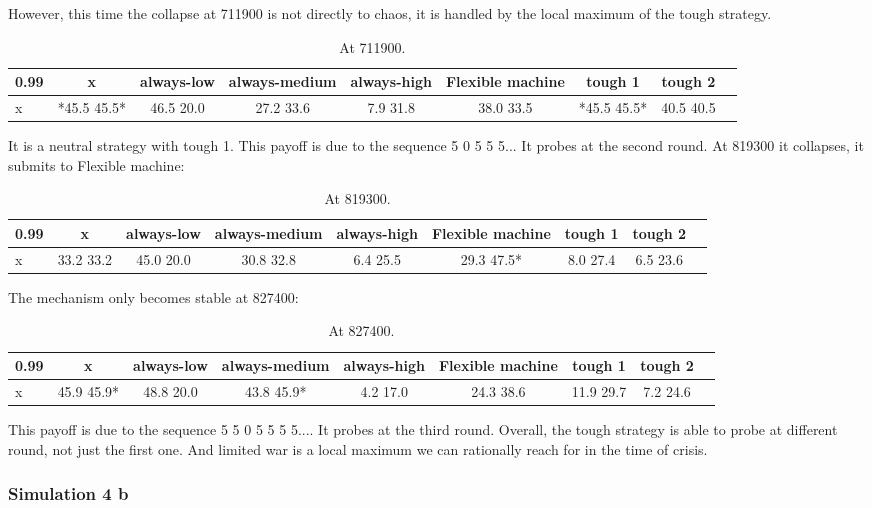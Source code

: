 \documentclass[12.5pt]{report}
\begin{document}
However, this time the collapse at 711900 is not directly to chaos, it is handled by the local maximum of the tough strategy.
\begin{table}[h!]
\center
\begin{tabular}{l|cccccccc}
\textbf{0.99}& x & always-low & always-medium & always-high & Flexible machine &tough 1 & tough 2\\
\hline
x&*45.5 45.5*   &  46.5 20.0   &   27.2 33.6 &     7.9 31.8   &    38.0 33.5   &  *45.5 45.5* &    40.5 40.5\\
\end{tabular}
\caption{At 711900.}
\end{table}

It is a neutral strategy with tough 1. This payoff is due to the sequence 5 0 5 5 5... It probes at the second round. At 819300 it collapses, it submits to Flexible machine:  
\begin{table}[h!]
\center
\begin{tabular}{l|cccccccc}
\textbf{0.99}& x & always-low & always-medium & always-high & Flexible machine &tough 1 & tough 2\\
\hline
x&33.2 33.2 &   45.0 20.0  &  30.8 32.8  &   6.4 25.5    & 29.3 47.5*&    8.0 27.4&     6.5 23.6 \\  
\end{tabular}
\caption{At 819300.}
\end{table}

The mechanism only becomes stable at 827400: 
\begin{table}[h!]
\center
\begin{tabular}{l|cccccccc}
\textbf{0.99}& x & always-low & always-medium & always-high & Flexible machine &tough 1 & tough 2\\
\hline
x&  45.9 45.9*&   48.8 20.0  &  43.8 45.9* &   4.2 17.0 &   24.3 38.6&    11.9 29.7 &    7.2 24.6\\  
\end{tabular}
\caption{At 827400.}
\end{table}

This payoff is due to the sequence 5 5 0 5 5 5 5.... It probes at the third round. Overall, the tough strategy is able to probe at different round, not just the first one. And limited war is a local maximum we can rationally reach for in the time of crisis.

\subsubsection{Simulation 4 b}
\end{document}
